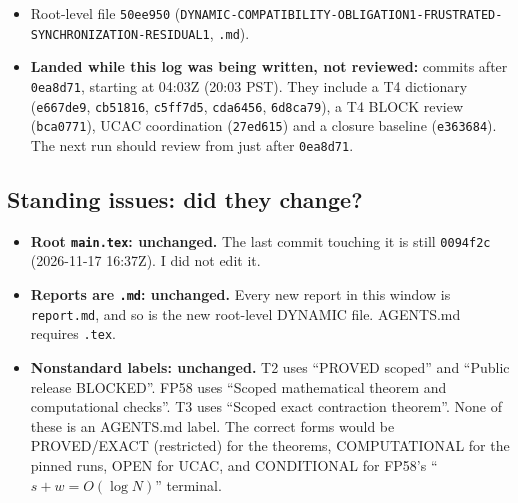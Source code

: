 \documentclass[11pt]{article}
\theoremstyle{definition}
\theoremstyle{remark}
\begin{document}
\begin{itemize}
\texttt{68be46d}, \texttt{cc142a5}, report \texttt{65eef23}
();
core certificates \texttt{7024502}, \texttt{0ea8d71}.
\item Root-level file \texttt{50ee950}
(\texttt{DYNAMIC-COMPATIBILITY-}\allowbreak\texttt{OBLIGATION1-}\allowbreak\texttt{FRUSTRATED-}\allowbreak\texttt{SYNCHRONIZATION-}\allowbreak\texttt{RESIDUAL1}, \texttt{.md}).
\item \textbf{Landed while this log was being written, not reviewed:} commits after
\texttt{0ea8d71}, starting at 04:03Z (20:03 PST). They include a T4 dictionary
(\texttt{e667de9}, \texttt{cb51816}, \texttt{c5ff7d5}, \texttt{cda6456}, \texttt{6d8ca79}),
a T4 BLOCK review (\texttt{bca0771}), UCAC coordination (\texttt{27ed615}) and a closure
baseline (\texttt{e363684}). The next run should review from just after \texttt{0ea8d71}.
\end{itemize}

\subsection{Standing issues: did they change?}
\begin{itemize}
\item \textbf{Root \texttt{main.tex}: unchanged.} The last commit touching it is still
\texttt{0094f2c} (2026-11-17 16:37Z). I did not edit it.
\item \textbf{Reports are \texttt{.md}: unchanged.} Every new report in this window is
\texttt{report.md}, and so is the new root-level DYNAMIC file. AGENTS.md requires
\texttt{.tex}.
\item \textbf{Nonstandard labels: unchanged.} T2 uses ``PROVED scoped'' and ``Public release
BLOCKED''. FP58 uses ``Scoped mathematical theorem and computational checks''. T3 uses
``Scoped exact contraction theorem''. None of these is an AGENTS.md label. The correct forms
would be PROVED/EXACT (restricted) for the theorems, COMPUTATIONAL for the pinned runs, OPEN
for UCAC, and CONDITIONAL for FP58's ``$s+w=O(\log N)$'' terminal.
\end{itemize}
\end{document}
